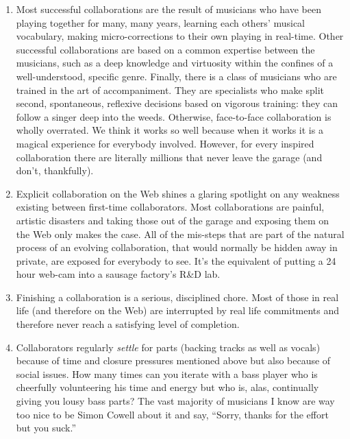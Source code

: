 \begin{enumerate}
    \item{Most successful collaborations are the result of musicians who have
        been playing together for many, many years, learning each others'
        musical vocabulary, making micro-corrections to their own playing in
        real-time. Other successful collaborations are based on a common
        expertise between the musicians, such as a deep knowledge and virtuosity
        within the conf\hbox{}ines of a well-understood, specif\hbox{}ic genre. F\hbox{}inally, there
        is a class of musicians who are trained in the art of accompaniment.
        They are specialists who make split second, spontaneous, ref\hbox{}lexive
        decisions based on vigorous training:  they can follow a singer deep
        into the weeds. Otherwise, face-to-face collaboration is wholly
        overrated. We think it works so well because when it works it is a
        magical experience for everybody involved. However, for every inspired
        collaboration there are literally millions that never leave the garage
        (and don't, thankfully).}
    \item{Explicit collaboration on the Web shines a glaring spotlight on any
        weakness existing between f\hbox{}irst-time collaborators. Most collaborations
        are painful, artistic disasters and taking those out of the garage and
        exposing them on the Web only makes the case. All of the mis-steps that
        are part of the natural process of an evolving collaboration, that would
        normally be hidden away in private, are exposed for everybody to see.
        It's the equivalent of putting a 24 hour web-cam into a sausage
        factory's R\&D lab. }
    \item{F\hbox{}inishing a collaboration is a serious, disciplined chore. Most of
        those in real life (and therefore on the Web) are interrupted by real
        life commitments and therefore never reach a satisfying level of
        completion.}
    \item{Collaborators regularly \textit{settle} for parts (backing tracks as
        well as vocals) because of time and closure pressures mentioned above
        but also because of social issues. How many times can you iterate with a
        bass player who is cheerfully volunteering his time and energy but who
        is, alas, continually giving you lousy bass parts? The vast majority of
        musicians I know are way too nice to be Simon Cowell about it and say,
        ``Sorry, thanks for the ef\hbox{}fort but you suck.''}
\end{enumerate}

